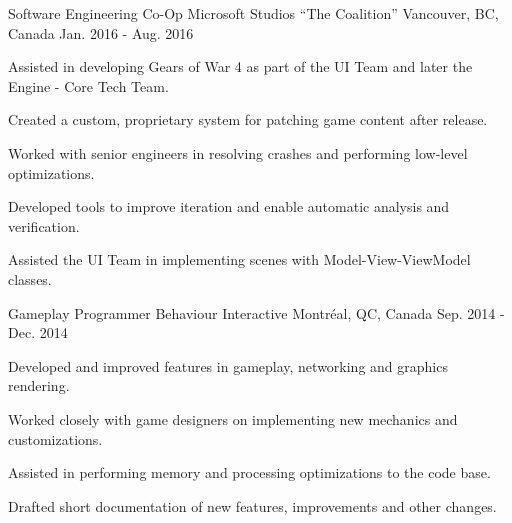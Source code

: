 

\begin{cventries}

  \cventry
    {Software Engineering Co-Op} %
    {Microsoft Studios ``The Coalition''} %
    {Vancouver, BC, Canada} %
    {Jan. 2016 - Aug. 2016} %
    {
      \begin{cvitems} %
        \item {Assisted in developing Gears of War 4 as part of the UI Team and later the Engine - Core Tech Team.}
        \item {Created a custom, proprietary system for patching game content after release.}
        \item {Worked with senior engineers in resolving crashes and performing low-level optimizations.}
        \item {Developed tools to improve iteration and enable automatic analysis and verification.}
        \item {Assisted the UI Team in implementing scenes with Model-View-ViewModel classes.}
        \\
      \end{cvitems}
    }

  \cventry
    {Gameplay Programmer} %
    {Behaviour Interactive} %
    {Montréal, QC, Canada} %
    {Sep. 2014 - Dec. 2014} %
    {
      \begin{cvitems} %
        \item {Developed and improved features in gameplay, networking and graphics rendering.}
        \item {Worked closely with game designers on implementing new mechanics and customizations.}
        \item {Assisted in performing memory and processing optimizations to the code base.}
        \item {Drafted short documentation of new features, improvements and other changes.}
        \\
      \end{cvitems}
    }

\end{cventries}
